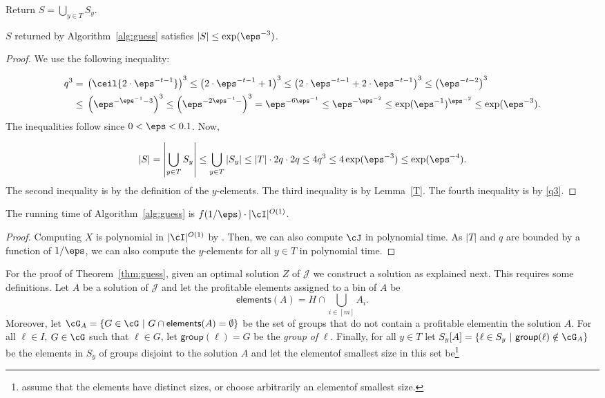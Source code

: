 {\begin{algorithm}[h]
	Return $S = \bigcup_{y \in T} S_y$. 
\end{algorithm}


\begin{lemma}
	\label{S}
	$S$ returned by Algorithm~\ref{alg:guess} satisfies $|S| \leq \exp(\eps^{-3})$.
\end{lemma}

\begin{proof}
	We use the following inequality:
	
	\begin{equation}
		\label{q3}
		\begin{aligned}
			q^3 ={} & \left(\ceil{2 \cdot \eps^{-t-1}} \right)^3 \leq \left(2 \cdot \eps^{-t-1}+1\right)^3 \leq \left(2 \cdot \eps^{-t-1}+2 \cdot \eps^{-t-1}\right)^3 \leq  \left(\eps^{-t-2}\right)^3 \\ 
			\leq{} &	\left(\eps^{-\eps^{-1}-3}\right)^3 \leq 	\left(\eps^{-2\eps^{-1}-}\right)^3 = \eps^{-6\eps^{-1}} \leq \eps^{-\eps^{-2}}   \leq \exp(\eps^{-1})^{\eps^{-2}} \leq \exp(\eps^{-3}). 
		\end{aligned}	
	\end{equation} The inequalities follow since $0<\eps<0.1$. Now, 
	
	$$|S| = \left|\bigcup_{y \in T} S_y\right| \leq \bigcup_{y \in T} \left|S_y\right| \leq |T| \cdot 2q\cdot 2q \leq 4q^3 \leq 4 \exp(\eps^{-3}) \leq \exp(\eps^{-4}).$$ The second inequality is by the definition of the $y$-elements. The third inequality is by Lemma~\ref{T}. The fourth inequality is by \eqref{q3}. 
\end{proof}

\begin{lemma}
	The running time of Algorithm~\ref{alg:guess} is $f(1/\eps) \cdot |\cI|^{O(1)}$. 
\end{lemma}

\begin{proof}
	Computing $X$ is polynomial in $ |\cI|^{O(1)}$ by \cite{fleischer2011tight}. Then, we can also compute $\cJ$ in polynomial time. As $|T|$ and $q$ are bounded by a function of $1/\eps$, we can also compute the $y$-elements for all $y \in T$ in polynomial time. 
\end{proof}

For the proof of Theorem~\ref{thm:guess}, given an optimal solution $Z$ of $\mathcal{J}$ we construct a solution as explained next. This requires some definitions. Let $A$ be a solution of $\mathcal{J}$ and let the profitable elements assigned to a bin of $A$ be $$\textsf{elements}(A) = H \cap \bigcup_{i \in [m]} A_i.$$ Moreover, let $\cG_A = \{G \in \cG~|~ G \cap \textsf{elements}(A) = \emptyset\}$ be the set of groups that do not contain a profitable elementin the solution $A$. For all $\ell \in I$, $G \in \cG$ such that $\ell \in G$, let $\textsf{group}(\ell) = G$ be the {\em group of} $\ell$. Finally, for all $y \in T$ let $S_y[A] = \{\ell \in S_y ~|~ \textsf{group}(\ell) \notin \cG_A\}$ be the elements in $S_y$ of groups disjoint to the solution $A$ and let the elementof smallest size in this set be\footnote{assume that the elements have distinct sizes, or choose arbitrarily an elementof smallest size.}

}
